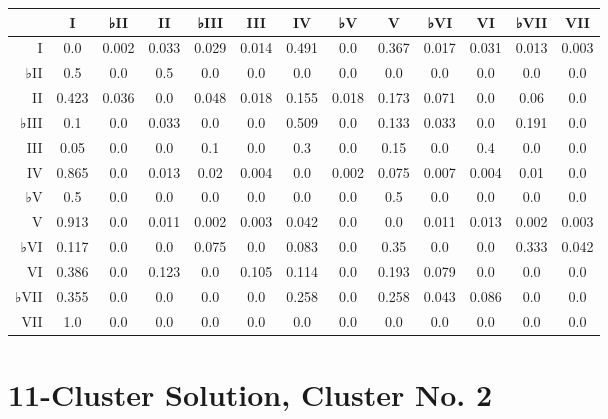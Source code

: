 \begin{table}[htbp]
\begin{minipage}{\linewidth}
\setlength{\tymax}{0.5\linewidth}
\centering
\small
\begin{tabulary}{\textwidth}{@{}RCCCCCCCCCCCC@{}} \toprule
&I&♭II&II&♭III&III&IV&♭V&V&♭VI&VI&♭VII&VII\\
\midrule
I&0.0&0.002&0.033&0.029&0.014&0.491&0.0&0.367&0.017&0.031&0.013&0.003\\
♭II&0.5&0.0&0.5&0.0&0.0&0.0&0.0&0.0&0.0&0.0&0.0&0.0\\
II&0.423&0.036&0.0&0.048&0.018&0.155&0.018&0.173&0.071&0.0&0.06&0.0\\
♭III&0.1&0.0&0.033&0.0&0.0&0.509&0.0&0.133&0.033&0.0&0.191&0.0\\
III&0.05&0.0&0.0&0.1&0.0&0.3&0.0&0.15&0.0&0.4&0.0&0.0\\
IV&0.865&0.0&0.013&0.02&0.004&0.0&0.002&0.075&0.007&0.004&0.01&0.0\\
♭V&0.5&0.0&0.0&0.0&0.0&0.0&0.0&0.5&0.0&0.0&0.0&0.0\\
V&0.913&0.0&0.011&0.002&0.003&0.042&0.0&0.0&0.011&0.013&0.002&0.003\\
♭VI&0.117&0.0&0.0&0.075&0.0&0.083&0.0&0.35&0.0&0.0&0.333&0.042\\
VI&0.386&0.0&0.123&0.0&0.105&0.114&0.0&0.193&0.079&0.0&0.0&0.0\\
♭VII&0.355&0.0&0.0&0.0&0.0&0.258&0.0&0.258&0.043&0.086&0.0&0.0\\
VII&1.0&0.0&0.0&0.0&0.0&0.0&0.0&0.0&0.0&0.0&0.0&0.0\\

\bottomrule

\end{tabulary}
\end{minipage}
\end{table}

\section{11-Cluster Solution, Cluster No. 2}
\label{11-clustersolutionclusterno.2}

